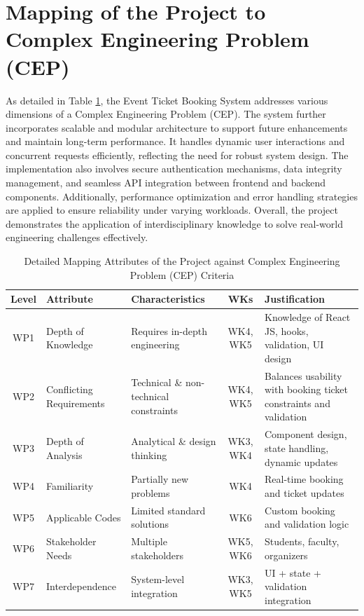 \documentclass[12pt]{report}
\begin{document}
\section{Mapping of the Project to Complex Engineering Problem (CEP)}

As detailed in Table \ref{tab:cep_mapping}, the Event Ticket Booking System addresses various dimensions of a Complex Engineering Problem (CEP). The system further incorporates scalable and modular architecture to support future enhancements and maintain long-term performance. It handles dynamic user interactions and concurrent requests efficiently, reflecting the need for robust system design. The implementation also involves secure authentication mechanisms, data integrity management, and seamless API integration between frontend and backend components. Additionally, performance optimization and error handling strategies are applied to ensure reliability under varying workloads. Overall, the project demonstrates the application of interdisciplinary knowledge to solve real-world engineering challenges effectively.


\begin{table}[H]
\centering
\renewcommand{\arraystretch}{1.4}
\setlength{\tabcolsep}{5pt}

\begin{tabularx}{\textwidth}{|c|l|X|c|X|}
\hline
\textbf{Level} & \textbf{Attribute} & \textbf{Characteristics} & \textbf{WKs} & \textbf{Justification} \\
\hline
WP1 & Depth of Knowledge & Requires in-depth engineering & WK4, WK5 & Knowledge of React JS, hooks, validation, UI design \\
\hline
WP2 & Conflicting Requirements & Technical \& non-technical constraints & WK4, WK5 & Balances usability with booking ticket constraints and validation \\
\hline
WP3 & Depth of Analysis & Analytical \& design thinking & WK3, WK4 & Component design, state handling, dynamic updates \\
\hline
WP4 & Familiarity & Partially new problems & WK4 & Real-time booking and ticket updates \\
\hline
WP5 & Applicable Codes & Limited standard solutions & WK6 & Custom booking and validation logic \\
\hline
WP6 & Stakeholder Needs & Multiple stakeholders & WK5, WK6 & Students, faculty, organizers \\
\hline
WP7 & Interdependence & System-level integration & WK3, WK5 & UI + state + validation integration \\
\hline
\end{tabularx}

\caption{Detailed Mapping Attributes of the Project against Complex Engineering Problem (CEP) Criteria}
\label{tab:cep_mapping}
\end{table}
\end{document}

